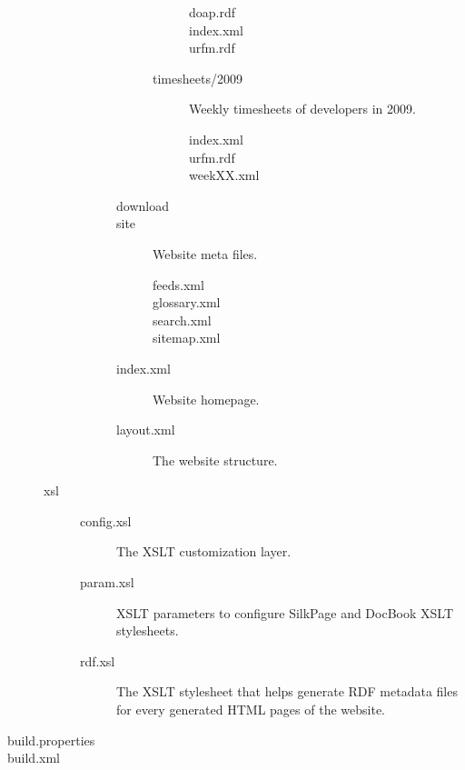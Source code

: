 \begin{description}
\begin{description}
\begin{description}
\begin{description}
\begin{description}
          \begin{description}
          \item[doap.rdf]
          \item[index.xml]
          \item[urfm.rdf]
          \end{description}
        \item[timesheets/2009] Weekly timesheets of developers in 2009.
          \begin{description}
          \item[index.xml]
          \item[urfm.rdf]
          \item[weekXX.xml]
          \end{description}
        \end{description}
      \item[download]
      \item[site] Website meta files.
        \begin{description}
        \item[feeds.xml]
        \item[glossary.xml]
        \item[search.xml]
        \item[sitemap.xml]
        \end{description}
      \item[index.xml] Website homepage.
      \item[layout.xml] The website structure.
      \end{description}
    \end{description}
  \item[xsl]
    \begin{description}
    \item[config.xsl] The XSLT customization layer.
    \item[param.xsl] XSLT parameters to configure SilkPage and DocBook
      XSLT stylesheets.
    \item[rdf.xsl] The XSLT stylesheet that helps generate RDF metadata files 
      for every generated HTML pages of the website.
    \end{description}
  \end{description}
\item[build.properties]
\item[build.xml]
\end{description}